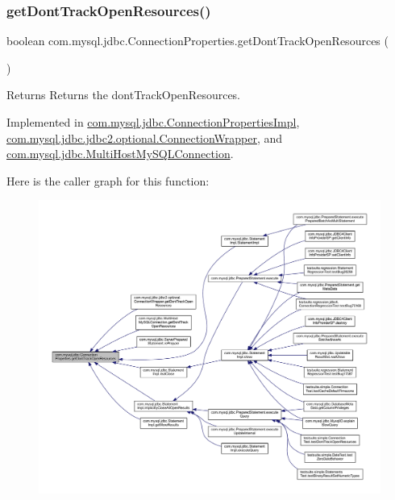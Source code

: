 \subsubsection{\texorpdfstring{get\+Dont\+Track\+Open\+Resources()}{getDontTrackOpenResources()}}
{\footnotesize\ttfamily boolean com.\+mysql.\+jdbc.\+Connection\+Properties.\+get\+Dont\+Track\+Open\+Resources (\begin{DoxyParamCaption}{ }\end{DoxyParamCaption})}

\begin{DoxyReturn}{Returns}
Returns the dont\+Track\+Open\+Resources. 
\end{DoxyReturn}


Implemented in \mbox{\hyperlink{classcom_1_1mysql_1_1jdbc_1_1_connection_properties_impl_af9fafd545458cac3d1e23e6ff2717a5e}{com.\+mysql.\+jdbc.\+Connection\+Properties\+Impl}}, \mbox{\hyperlink{classcom_1_1mysql_1_1jdbc_1_1jdbc2_1_1optional_1_1_connection_wrapper_a8d9246e6e3a72c4ecfeca155225eafa9}{com.\+mysql.\+jdbc.\+jdbc2.\+optional.\+Connection\+Wrapper}}, and \mbox{\hyperlink{classcom_1_1mysql_1_1jdbc_1_1_multi_host_my_s_q_l_connection_a19be4784393f9abfc6ae0cf6a404af0a}{com.\+mysql.\+jdbc.\+Multi\+Host\+My\+S\+Q\+L\+Connection}}.

Here is the caller graph for this function\+:\nopagebreak
\begin{figure}[H]
\begin{center}
\leavevmode
\includegraphics[width=350pt]{interfacecom_1_1mysql_1_1jdbc_1_1_connection_properties_aec0f6158d9bacdc45d430fbddcc93120_icgraph}
\end{center}
\end{figure}
\mbox{\label{interfacecom_1_1mysql_1_1jdbc_1_1_connection_properties_a582cd7a28b4d507bf0e3ceaae3680763}} 
